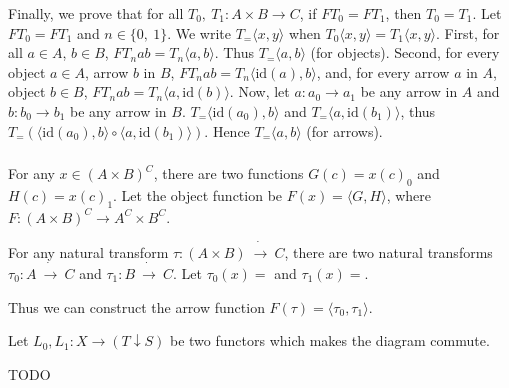 \documentclass{article}
\begin{document}
Finally, we prove that for all $T_0,\ T_1 : A \times B \rightarrow C$, if $FT_0 = FT_1$, then $T_0 = T_1$. Let $FT_0 = FT_1$ and $n \in \{0,\ 1\}$. We write $T_=\langle x, y \rangle$ when $T_0\langle x, y \rangle = T_1\langle x, y \rangle$. First, for all $a \in A$, $b \in B$, $FT_nab = T_n\langle a, b \rangle$. Thus $T_=\langle a, b \rangle$ (for objects). Second, for every object $a \in A$, arrow $b$ in $B$, $FT_nab = T_n\langle \mathrm{id}(a), b \rangle$, and, for every arrow $a$ in $A$, object $b \in B$, $FT_nab = T_n\langle a, \mathrm{id}(b) \rangle$. Now, let $a : a_0 \rightarrow a_1$ be any arrow in $A$ and $b : b_0 \rightarrow b_1$ be any arrow in $B$. $T_=\langle \mathrm{id}(a_0), b \rangle$ and $T_=\langle a, \mathrm{id}(b_1)\rangle$, thus $T_=(\langle \mathrm{id}(a_0), b \rangle \circ \langle a, \mathrm{id}(b_1) \rangle)$. Hence $T_=\langle a, b \rangle$ (for arrows).

\subsubsection{}

\showArt

For any $x \in (A \times B)^C$, there are two functions $G(c) = x(c)_0$ and $H(c) = x(c)_1$. Let the object function be $F(x) = \langle G, H \rangle$, where $F : (A \times B)^C \rightarrow A^C \times B^C$.

For any natural transform $\tau : (A \times B)\ \dot{\rightarrow}\ C$, there are two natural transforms $\tau_0 : A\ \dot{\rightarrow}\ C$ and $\tau_1 : B\ \dot{\rightarrow}\ C$. Let $\tau_0(x) = $ and $\tau_1(x) = $.

Thus we can construct the arrow function $F(\tau) = \langle \tau_0, \tau_1 \rangle$.

Let $L_0, L_1 : X \rightarrow (T \downarrow S)$ be two functors which makes the diagram commute.

TODO

\subsubsection{}

\subsubsection{}

\subsubsection{}
\end{document}
